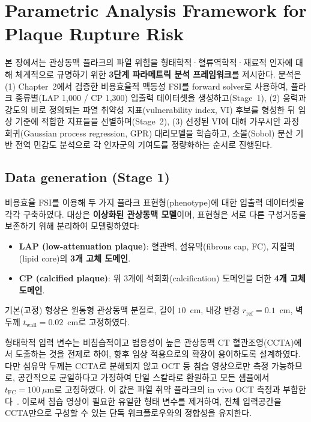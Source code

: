 \documentclass[master,english,final]{kaist-ucs}
\begin{document}
\chapter{Parametric Analysis Framework for Plaque Rupture Risk}


본 장에서는 관상동맥 플라크의 파열 위험을 형태학적·혈류역학적·재료적 인자에 대해 체계적으로 규명하기 위한 \textbf{3단계 파라메트릭 분석 프레임워크}를 제시한다. 분석은 (1) Chapter~2에서 검증한 비용효율적 맥동성 FSI를 forward solver로 사용하여, 플라크 종류별(LAP 1{,}000 / CP 1{,}300) 입출력 데이터셋을 생성하고(Stage~1), (2) 응력과 강도의 비로 정의되는 파열 취약성 지표(vulnerability index, VI) 후보를 형성한 뒤 임상 기준에 적합한 지표들을 선별하며(Stage~2), (3) 선정된 VI에 대해 가우시안 과정 회귀(Gaussian process regression, GPR) 대리모델을 학습하고, 소볼(Sobol) 분산 기반 전역 민감도 분석으로 각 인자군의 기여도를 정량화하는 순서로 진행된다.

\section{Data generation (Stage 1)}

비용효율 FSI를 이용해 두 가지 플라크 표현형(phenotype)에 대한 입출력 데이터셋을 각각 구축하였다. 대상은 \textbf{이상화된 관상동맥 모델}이며, 표현형은 서로 다른 구성거동을 보존하기 위해 분리하여 모델링하였다:

\begin{itemize}
\item \textbf{LAP (low-attenuation plaque)}: 혈관벽, 섬유막(fibrous cap, FC), 지질핵(lipid core)의 \textbf{3개 고체 도메인}.
\item \textbf{CP (calcified plaque)}: 위 3개에 석회화(calcification) 도메인을 더한 \textbf{4개 고체 도메인}.
\end{itemize}

기본(고정) 형상은 원통형 관상동맥 분절로, 길이 $10$~cm, 내강 반경 $r_\mathrm{ref}=0.1$~cm, 벽 두께 $t_\mathrm{wall}=0.02$~cm로 고정하였다.

형태학적 입력 변수는 비침습적이고 범용성이 높은 관상동맥 CT 혈관조영(CCTA)에서 도출하는 것을 전제로 하여, 향후 임상 적용으로의 확장이 용이하도록 설계하였다. 다만 섬유막 두께는 CCTA로 분해되지 않고 OCT 등 침습 영상으로만 측정 가능하므로, 공간적으로 균일하다고 가정하여 단일 스칼라로 환원하고 모든 샘플에서 $t_\mathrm{FC}=100\ \mu\mathrm{m}$로 고정하였다. 이 값은 파열 취약 플라크의 in vivo OCT 측정과 부합한다~\cite{ref12, ref13}. 이로써 침습 영상이 필요한 유일한 형태 변수를 제거하여, 전체 입력공간을 CCTA만으로 구성할 수 있는 단독 워크플로우와의 정합성을 유지한다.
\end{document}
